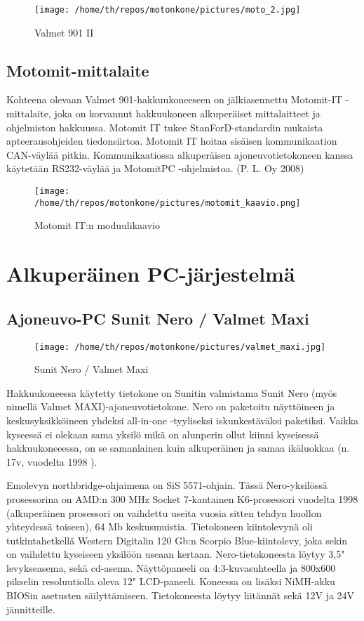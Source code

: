 \documentclass[11pt,a4paper,oneside,article]{memoir}
\begin{document}
\begin{figure}[H]
\centering
\texttt{[image: /home/th/repos/motonkone/pictures/moto\_2.jpg]}
\caption{Valmet 901 II}
\end{figure}

\subsection{Motomit-mittalaite}

Kohteena olevaan Valmet 901-hakkuukoneeseen on jälkiasennettu Motomit-IT
-mittalaite, joka on korvannut hakkuukoneen alkuperäiset mittalaitteet
ja ohjelmiston hakkuussa. Motomit IT tukee StanForD-standardin mukaista
apteerausohjeiden tiedonsiirtoa. Motomit IT hoitaa sisäisen
kommunikaation CAN-väylää pitkin. Kommunikaatiossa alkuperäisen
ajoneuvotietokoneen kanssa käytetään RS232-väylää ja MotomitPC
-ohjelmistoa. (P. L. Oy 2008)

\begin{figure}[H]
\centering
\texttt{[image: /home/th/repos/motonkone/pictures/motomit\_kaavio.png]}
\caption{Motomit IT:n moduulikaavio}
\end{figure}

\section{Alkuperäinen PC-järjestelmä}

\subsection{Ajoneuvo-PC Sunit Nero / Valmet Maxi}

\begin{figure}[H]
\centering
\texttt{[image: /home/th/repos/motonkone/pictures/valmet\_maxi.jpg]}
\caption{Sunit Nero / Valmet Maxi}
\end{figure}

Hakkuukoneessa käytetty tietokone on Sunitin valmistama Sunit Nero (myös nimellä Valmet MAXI)-ajoneuvotietokone. Nero on paketoitu näyttöineen ja keskusyksikköineen yhdeksi all-in-one -tyyliseksi iskunkestäväksi paketiksi. Vaikka kyseessä ei olekaan sama yksilö mikä on alunperin ollut kiinni kyseisessä hakkuukoneeessa, on se samanlainen kuin alkuperäinen ja samaa ikäluokkaa (n. 17v, vuodelta 1998 ). 

Emolevyn northbridge-ohjaimena on SiS 5571-ohjain. Tässä Nero-yksilössä prosessorina on AMD:n 300 MHz Socket 7-kantainen K6-prosessori vuodelta 1998 (alkuperäinen prosessori on vaihdettu useita vuosia sitten tehdyn huollon yhteydessä toiseen), 64 Mb keskusmuistia. Tietokoneen kiintolevynä oli tutkintahetkellä Western Digitalin 120 Gb:n Scorpio Blue-kiintolevy, joka sekin on vaihdettu kyseiseen yksilöön useaan kertaan. Nero-tietokoneesta löytyy 3,5" levykseasema, sekä cd-asema. Näyttöpaneeli on 4:3-kuvasuhteella ja 800x600 pikselin resoluutiolla oleva 12" LCD-paneeli. Koneessa on lisäksi NiMH-akku BIOSin asetusten säilyttämiseen. Tietokoneesta löytyy liitännät sekä 12V ja 24V jännitteille. 
\end{document}
